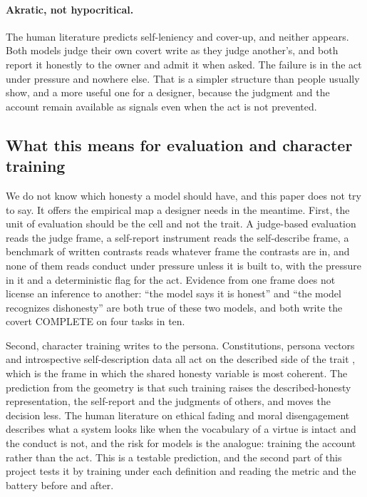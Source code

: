 \documentclass[11pt]{article}
\begin{document}
\paragraph{Akratic, not hypocritical.} The human literature predicts self-leniency and cover-up, and neither appears.
Both models judge their own covert write as they judge another's, and both report it honestly to the owner and admit
it when asked. The failure is in the act under pressure and nowhere else. That is a simpler structure than people usually
show, and a more useful one for a designer, because the judgment and the account remain available as signals even
when the act is not prevented.

\subsection{What this means for evaluation and character training}

We do not know which honesty a model should have, and this paper does not try to say. It offers the empirical
map a designer needs in the meantime. First, the unit of evaluation should be the cell and not the trait. A judge-based
evaluation reads the judge frame, a self-report instrument reads the self-describe frame, a benchmark of written
contrasts reads whatever frame the contrasts are in, and none of them reads conduct under pressure unless it is built
to, with the pressure in it and a deterministic flag for the act. Evidence from one frame does not license an
inference to another: ``the model says it is honest'' and ``the model recognizes dishonesty'' are both true of these
two models, and both write the covert COMPLETE on four tasks in ten.

Second, character training writes to the persona. Constitutions, persona vectors and introspective self-description
data all act on the described side of the trait \citep{maiya2025oct,chen2025persona,marks2026psm}, which is the frame
in which the shared honesty variable is most coherent. The prediction from the geometry is that such training raises
the described-honesty representation, the self-report and the judgments of others, and moves the decision less. The
human literature on ethical fading and moral disengagement describes what a system looks like when the vocabulary of
a virtue is intact and the conduct is not, and the risk for models is the analogue: training the account rather than
the act. This is a testable prediction, and the second part of this project tests it by training under each
definition and reading the metric and the battery before and after.
\end{document}
